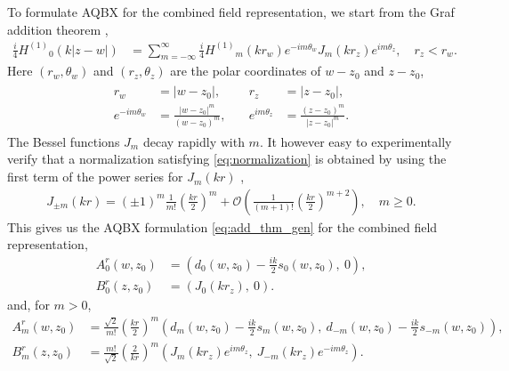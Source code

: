 \documentclass[hidelinks]{siamart1116}
\begin{document}
To formulate AQBX for the combined field representation, we start from
the Graf addition theorem \cite[\S10.23(ii)]{NIST:DLMF},
\begin{align}
  \frac{i}{4} {H^{(1)}}_0(k|z-w|) 
  &= \sum_{m=-\infty}^\infty 
    \frac{i}{4} {H^{(1)}}_m(kr_w) e^{-im\theta_w}
    J_m(kr_z) e^{im\theta_z}, 
    \quad r_z < r_w .
    \label{eq:grafadd}
\end{align}
Here $(r_w,\theta_w)$ and $(r_z,\theta_z)$ are the polar coordinates
of $w-z_0$ and $z-z_0$,
\begin{align}
  \begin{aligned}
    r_w &= |w-z_0|, & r_z &= |z-z_0|, \\
    e^{-im\theta_w} &= \frac{|w-z_0|^m}{(w-z_0)^m}, \quad & e^{im\theta_z} &= \frac{(z-z_0)^m}{|z-z_0|^m}. 
  \end{aligned} \label{eq:exppot}
\end{align}
The Bessel functions $J_m$ decay rapidly with $m$. It however easy to
experimentally verify that a normalization satisfying
\eqref{eq:normalization} is obtained by using the first term of the
power series for $J_m(kr)$ \cite[\S10.4,\S10.8]{NIST:DLMF},
\begin{align}
  J_{\pm m}(kr) = (\pm 1)^m \frac{1}{m!} \left( \frac{kr}{2} \right)^m
  + {\mathcal{O}}\left( \frac{1}{(m+1)!} \left( \frac{kr}{2} \right)^{m+2} \right),
  \quad m \ge 0.
\end{align}
This gives us the AQBX formulation \eqref{eq:add_thm_gen} for the
combined field representation,
\begin{align}
  {A}_0^r(w, z_0) &=                      
                      \left( {d}_0(w, z_0) - \frac{ik}{2} {s}_0(w, z_0), \:
                      0 \right),
                      \label{eq:addA0_helm}\\
  {B}_0^r(z, z_0) &= 
                      \left( J_0(kr_z), \: 0 \right)
                      \label{eq:addB0_helm}.
\end{align}
and, for $m>0$,
\begin{align}
  {A}_m^r(w, z_0) &= \frac{\sqrt{2}}{m!}  \left( \frac{kr}{2} \right)^{m} 
                      \left( {d}_m(w, z_0) - \frac{ik}{2} {s}_m(w, z_0), \:
                      {d}_{-m}(w, z_0) - \frac{ik}{2} {s}_{-m}(w, z_0) \right),
                      \label{eq:addA_helm}\\
  {B}_m^r(z, z_0) &= \frac{m!}{\sqrt{2}} \left( \frac{2}{kr} \right)^{m} 
                      \left( J_m(kr_z) e^{im\theta_z}, \: J_{-m}(kr_z) e^{-im\theta_z} \right)
                      \label{eq:addB_helm}.
\end{align}
\end{document}
